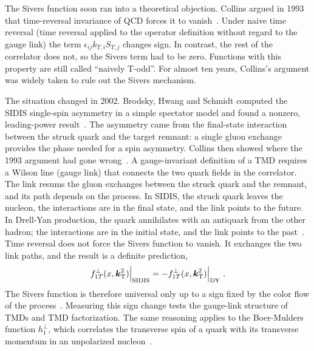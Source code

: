 The Sivers function soon ran into a theoretical objection. Collins argued in 1993 that time-reversal invariance of QCD forces it to vanish~\cite{Collins:1992kk}. Under naive time reversal (time reversal applied to the operator definition without regard to the gauge link) the term $\epsilon_{ij}k_{T,i}S_{T,j}$ changes sign. In contrast, the rest of the correlator does not, so the Sivers term had to be zero. Functions with this property are still called ``naively T-odd''. For almost ten years, Collins's argument was widely taken to rule out the Sivers mechanism.

The situation changed in 2002. Brodsky, Hwang and Schmidt computed the SIDIS single-spin asymmetry in a simple spectator model and found a nonzero, leading-power result~\cite{Brodsky:2002cx}. The asymmetry came from the final-state interaction between the struck quark and the target remnant: a single gluon exchange provides the phase needed for a spin asymmetry. Collins then showed where the 1993 argument had gone wrong~\cite{Collins:2002kn}. A gauge-invariant definition of a TMD requires a Wilson line (gauge link) that connects the two quark fields in the correlator. The link resums the gluon exchanges between the struck quark and the remnant, and its path depends on the process. In SIDIS, the struck quark leaves the nucleon, the interactions are in the final state, and the link points to the future. In Drell-Yan production, the quark annihilates with an antiquark from the other hadron; the interactions are in the initial state, and the link points to the past~\cite{Brodsky:2002rv,Belitsky:2002sm,Boer:2003cm}. Time reversal does not force the Sivers function to vanish. It exchanges the two link paths, and the result is a definite prediction,
\begin{equation}
  f_{1T}^{\perp}(x,\boldsymbol{k}_{\mathrm T}^2)\Big|_{\text{SIDIS}} = - f_{1T}^{\perp}(x,\boldsymbol{k}_{\mathrm T}^2)\Big|_{\text{DY}} \ .
  \label{eq:intro_sign_change}
\end{equation}
The Sivers function is therefore universal only up to a sign fixed by the color flow of the process~\cite{Collins:2002kn,Kang:2009bp}. Measuring this sign change tests the gauge-link structure of TMDs and TMD factorization. The same reasoning applies to the Boer-Mulders function $h_1^\perp$, which correlates the transverse spin of a quark with its transverse momentum in an unpolarized nucleon~\cite{Boer:1997nt,Boer:2003cm}.

